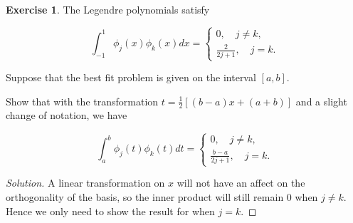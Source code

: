 \documentclass[12pt,a4]{article}
\theoremstyle{definition}
\newtheorem{exercise}{Exercise}
\begin{document}
\begin{exercise}
	The Legendre polynomials satisfy 
	
	\[
	\int_{-1}^{1} \phi_j(x) \phi_k(x) dx = \begin{cases}
	0 {,} \quad j \neq k {,} \\
	\frac{2}{2 j + 1} {,} \quad j = k {.}
	\end{cases}
	\]
	
	\noindent Suppose that the best fit problem is given on the interval $[a, b]$. 
	
	Show that with the transformation $t = \frac{1}{2} [(b - a) x + (a + b)]$ and a slight change of notation, we have 
	
	\[
	\int_a^b \phi_j(t) \phi_k(t) dt = \begin{cases}
	0 {,} \quad j \neq k {,} \\
	\frac{b - a}{2 j + 1} {,} \quad j = k {.}
	\end{cases}
	\]
\end{exercise}
\begin{proof}[Solution]
	A linear transformation on $x$ will not have an affect on the orthogonality of the basis, so the inner product will still remain $0$ when $j \neq k$. Hence we only need to show the result for when $j = k$. 
\end{proof}
\end{document}
